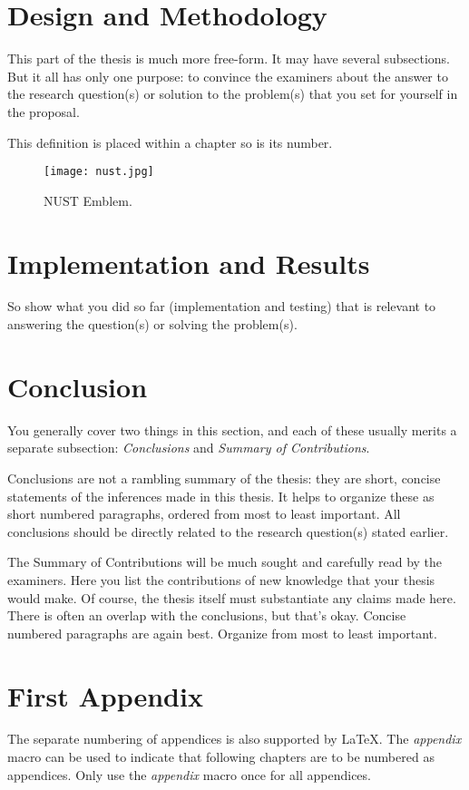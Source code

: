 \documentclass[12pt,a4paper,oneside]{book} %
\begin{document}
\chapter{Design and Methodology}
\label{c-methods}

This part of the thesis is much more free-form. It may have several
subsections. But it all has only one purpose: to convince the examiners
about the answer to the research question(s) or solution to the problem(s) that
you set for yourself in the proposal.

\begin{definition}[Testing 1,2,3]
This definition is placed within a chapter so is its number.
\end{definition}

\begin{figure}[htp]
\begin{center}
  \texttt{[image: nust.jpg]}
  \caption{NUST Emblem.}
  \label{f-nust}
\end{center}
\end{figure}


\chapter{Implementation and Results}
\label{c-results}

So show what you did so far (implementation and testing) that is relevant to
answering the question(s) or solving the problem(s).



\chapter{Conclusion}
\label{c-conclusion}

You generally cover two things in this section, and each of these usually merits
a separate subsection: \textit{Conclusions} and \textit{Summary of
Contributions}.

Conclusions are not a rambling summary of the thesis: they are short, concise
statements of the inferences made in this thesis. It helps to organize these as
short numbered paragraphs, ordered from most to least important. All conclusions
should be directly related to the research question(s) stated earlier.

The Summary of Contributions will be much sought and carefully read by the
examiners. Here you list the contributions of new knowledge that your thesis
would make. Of course, the thesis itself must substantiate any claims made here.
There is often an overlap with the conclusions, but that's okay. Concise numbered
paragraphs are again best. Organize from most to least important.


\appendix
\chapter{First Appendix}
The separate numbering of appendices is also supported by LaTeX. The \textit{appendix} macro can be used to indicate that following chapters are to be numbered as appendices. Only use the \textit{appendix} macro once for all appendices.




\end{document}

